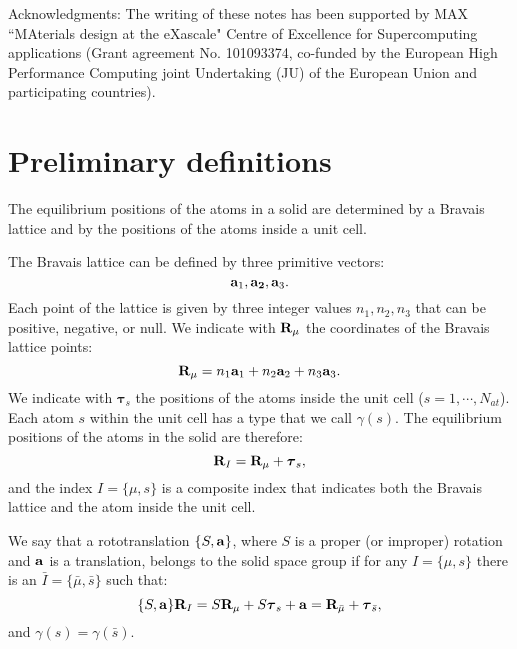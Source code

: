 \documentclass[12pt,a4paper,twoside]{report}
\begin{document}
Acknowledgments: The writing of these notes
has been supported by MAX ``MAterials design at the eXascale" Centre of Excellence 
for Supercomputing applications (Grant agreement No. 101093374, co-funded by the European High Performance 
Computing joint Undertaking (JU) of the European Union and participating countries).

\newpage
\section{Preliminary definitions}
The equilibrium positions of the atoms in a solid are determined by
a Bravais lattice and by the positions of the atoms inside a unit cell.

The Bravais lattice can be defined by three primitive vectors:
\begin{equation}
{\bf a}_1, {\bf a_2}, {\bf a}_3.
\end{equation}
Each point of the lattice is given by three integer values
$n_1, n_2, n_3$ that can be positive, negative, or null.
We indicate with ${\bf R}_\mu$ the coordinates of the Bravais lattice
points:
\begin{equation}
{\bf R}_\mu = n_1 {\bf a}_1 + n_2 {\bf a}_2 + n_3 {\bf a}_3.
\end{equation}
We indicate with $\boldsymbol{\tau}_s$ the positions of the atoms
inside the unit cell ($s=1,\cdots, N_{at}$).
Each atom $s$ within the
unit cell has a type that we call $\gamma(s)$.
The equilibrium positions of the atoms in the solid are therefore:
\begin{equation}
{\bf R}_I = {\bf R}_\mu + \boldsymbol{\tau}_s,
\end{equation}
and the index $I=\{\mu,s\}$ is a composite index that indicates both the
Bravais lattice and the atom inside the unit cell.

We say that a rototranslation $\{S,{\bf a}\}$, where $S$ is a proper
(or improper) rotation and ${\bf a}$ is a translation, belongs to the solid
space group if for any $I=\{\mu,s\}$ there is an
$\bar I=\{\bar \mu,\bar s\}$ such that:
\begin{equation}
\{S,{\bf a}\} {\bf R}_I = S {\bf R}_\mu + S \boldsymbol{\tau}_s + {\bf a} =
{\bf R}_{\bar \mu} + \boldsymbol{\tau}_{\bar s},
\label{sg}
\end{equation}
and $\gamma(s)=\gamma(\bar s)$.
\end{document}
